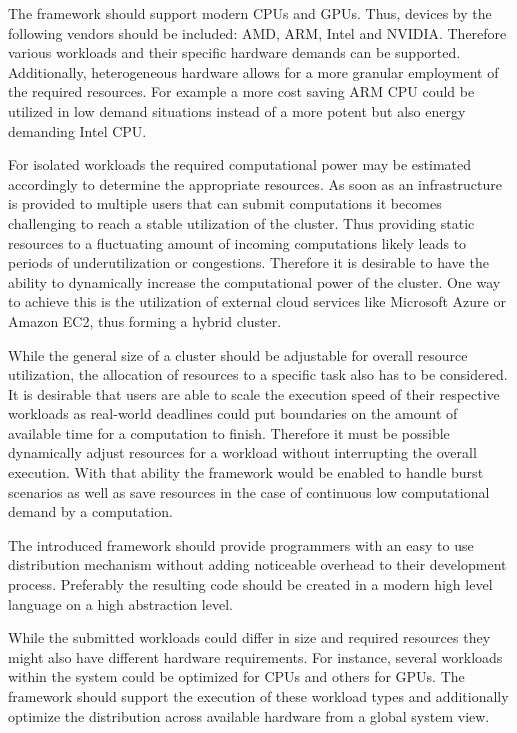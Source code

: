 \begin{description}[style=nextline]
    \item [Heterogeneity]
    The framework should support modern CPUs and GPUs. Thus, devices by the following vendors should be included: AMD, ARM, Intel and NVIDIA. Therefore various workloads and their specific hardware demands can be supported. Additionally, heterogeneous hardware allows for a more granular employment of the required resources. For example a more cost saving ARM CPU could be utilized in low demand situations instead of a more potent but also energy demanding Intel CPU.

    \item [Resource Scalability]
    For isolated workloads the required computational power may be estimated accordingly to determine the appropriate resources. As soon as an infrastructure is provided to multiple users that can submit computations it becomes challenging to reach a stable utilization of the cluster. Thus providing static resources to a fluctuating amount of incoming computations likely leads to periods of underutilization or congestions. Therefore it is desirable to have the ability to dynamically increase the computational power of the cluster. One way to achieve this is the utilization of external cloud services like Microsoft Azure or Amazon EC2, thus forming a hybrid cluster.

    \item [Scalable Speed]
    While the general size of a cluster should be adjustable for overall resource utilization, the allocation of resources to a specific task also has to be considered. It is desirable that users are able to scale the execution speed of their respective workloads as real-world deadlines could put boundaries on the amount of available time for a computation to finish. Therefore it must be possible dynamically adjust resources for a workload without interrupting the overall execution. With that ability the framework would be enabled to handle burst scenarios as well as save resources in the case of continuous low computational demand by a computation.

    \item [Ease of Programming]
    The introduced framework should provide programmers with an easy to use distribution mechanism without adding noticeable overhead to their development process. Preferably the resulting code should be created in a modern high level language on a high abstraction level.

    \item [Workload Diversity]
    While the submitted workloads could differ in size and required resources they might also have different hardware requirements. For instance, several workloads within the system could be optimized for CPUs and others for GPUs. The framework should support the execution of these workload types and additionally optimize the distribution across available hardware from a global system view.


\end{description}

